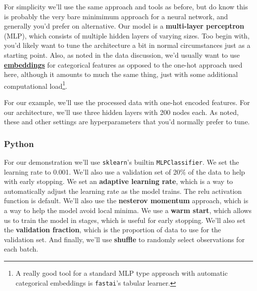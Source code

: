 \documentclass[
  letterpaper,
]{krantz}
\begin{document}
For simplicity we'll use the same approach and tools as before, but do
know this is probably the very bare minimimum approach for a neural
network, and generally you'd prefer on alternative. Our model is a
\textbf{multi-layer perceptron} (MLP), which consists of multiple hidden
layers of varying sizes. Too begin with, you'd likely want to tune the
architecture a bit in normal circumstances just as a starting point.
Also, as noted in the data discussion, we'd usually want to use
\hyperref[data-cat]{\textbf{embeddings}} for categorical features as
opposed to the one-hot approach used here, although it amounts to much
the same thing, just with some additional computational load\footnote{A
  really good tool for a standard MLP type approach with automatic
  categorical embeddings is \texttt{fastai}'s tabular learner.}.

For our example, we'll use the processed data with one-hot encoded
features. For our architecture, we'll use three hidden layers with 200
nodes each. As noted, these and other settings are hyperparameters that
you'd normally prefer to tune.

\subsubsection{Python}

For our demonstration we'll use \texttt{sklearn}'s builtin
\texttt{MLPClassifier}. We set the learning rate to 0.001. We'll also
use a validation set of 20\% of the data to help with early stopping. We
set an \textbf{adaptive learning rate}, which is a way to automatically
adjust the learning rate as the model trains. The relu activation
function is default. We'll also use the \textbf{nesterov momentum}
approach, which is a way to help the model avoid local minima. We use a
\textbf{warm start}, which allows us to train the model in stages, which
is useful for early stopping. We'll also set the \textbf{validation
fraction}, which is the proportion of data to use for the validation
set. And finally, we'll use \textbf{shuffle} to randomly select
observations for each batch.
\end{document}
